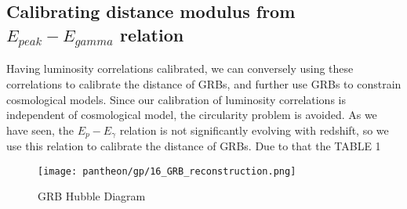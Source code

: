 \subsection{Calibrating distance modulus from $E_{peak}-E_{gamma}$ relation}
Having luminosity correlations calibrated, we can conversely using these correlations to calibrate the distance of GRBs, and further use GRBs to constrain cosmological models. Since our calibration of luminosity correlations is independent of cosmological model, the circularity problem is avoided. As we have seen, the $E_{p}-E_{\gamma}$ relation is not significantly evolving with redshift, so we use this relation to calibrate the distance of GRBs. Due to that the TABLE 1
\begin{figure}[h]
	\centering
	\texttt{[image: pantheon/gp/16\_GRB\_reconstruction.png]}
	\caption{GRB Hubble Diagram}
	\label{fig:HD_GRB_GP}
\end{figure}